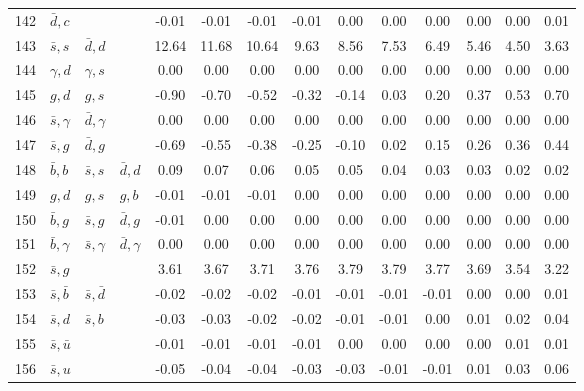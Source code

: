 \begin{tabularx}{\textwidth}{rXXX@{}S@{}S@{}S@{}S@{}S@{}S@{}S@{}S@{}S@{}S}
142 & $\bar d, c$      &                   &                  & -0.01 & -0.01 & -0.01 & -0.01 &  0.00 &  0.00 &  0.00 &  0.00 &  0.00 &  0.01 \\
143 & $\bar s, s$      & $\bar d, d$       &                  & 12.64 & 11.68 & 10.64 &  9.63 &  8.56 &  7.53 &  6.49 &  5.46 &  4.50 &  3.63 \\
144 & $\gamma, d$      & $\gamma, s$       &                  &  0.00 &  0.00 &  0.00 &  0.00 &  0.00 &  0.00 &  0.00 &  0.00 &  0.00 &  0.00 \\
145 & $g, d$           & $g, s$            &                  & -0.90 & -0.70 & -0.52 & -0.32 & -0.14 &  0.03 &  0.20 &  0.37 &  0.53 &  0.70 \\
146 & $\bar s, \gamma$ & $\bar d, \gamma$  &                  &  0.00 &  0.00 &  0.00 &  0.00 &  0.00 &  0.00 &  0.00 &  0.00 &  0.00 &  0.00 \\
147 & $\bar s, g$      & $\bar d, g$       &                  & -0.69 & -0.55 & -0.38 & -0.25 & -0.10 &  0.02 &  0.15 &  0.26 &  0.36 &  0.44 \\
148 & $\bar b,  b$     & $\bar s, s$       & $\bar d, d$      &  0.09 &  0.07 &  0.06 &  0.05 &  0.05 &  0.04 &  0.03 &  0.03 &  0.02 &  0.02 \\
149 & $g,  d$          & $g, s$            & $g, b$           & -0.01 & -0.01 & -0.01 &  0.00 &  0.00 &  0.00 &  0.00 &  0.00 &  0.00 &  0.00 \\
150 & $\bar b, g$      & $\bar s, g$       & $\bar d, g$      & -0.01 &  0.00 &  0.00 &  0.00 &  0.00 &  0.00 &  0.00 &  0.00 &  0.00 &  0.00 \\
151 & $\bar b, \gamma$ & $\bar s, \gamma$  & $\bar d, \gamma$ &  0.00 &  0.00 &  0.00 &  0.00 &  0.00 &  0.00 &  0.00 &  0.00 &  0.00 &  0.00 \\
152 & $\bar s, g$      &                   &                  &  3.61 &  3.67 &  3.71 &  3.76 &  3.79 &  3.79 &  3.77 &  3.69 &  3.54 &  3.22 \\
153 & $\bar s, \bar b$ & $\bar s, \bar d$  &                  & -0.02 & -0.02 & -0.02 & -0.01 & -0.01 & -0.01 & -0.01 &  0.00 &  0.00 &  0.01 \\
154 & $\bar s, d$      & $\bar s, b$       &                  & -0.03 & -0.03 & -0.02 & -0.02 & -0.01 & -0.01 &  0.00 &  0.01 &  0.02 &  0.04 \\
155 & $\bar s, \bar u$ &                   &                  & -0.01 & -0.01 & -0.01 & -0.01 &  0.00 &  0.00 &  0.00 &  0.00 &  0.01 &  0.01 \\
156 & $\bar s, u$      &                   &                  & -0.05 & -0.04 & -0.04 & -0.03 & -0.03 & -0.01 & -0.01 &  0.01 &  0.03 &  0.06 \\

\end{tabularx}
